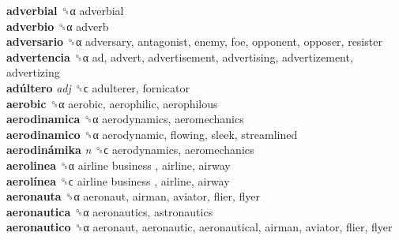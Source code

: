 \textbf{adverbial} ␝α  adverbial  \\
\textbf{adverbio} ␝α  adverb  \\
\textbf{adversario} ␝α  adversary, antagonist, enemy, foe, opponent, opposer, resister  \\
\textbf{advertencia} ␝α  ad, advert, advertisement, advertising, advertizement, advertizing  \\
\textbf{adúltero} \emph{adj}  ␝ϲ  adulterer, fornicator  \\
\textbf{aerobic} ␝α  aerobic, aerophilic, aerophilous  \\
\textbf{aerodinamica} ␝α  aerodynamics, aeromechanics  \\
\textbf{aerodinamico} ␝α  aerodynamic, flowing, sleek, streamlined  \\
\textbf{aerodinámika} \emph{n}  ␝ϲ  aerodynamics, aeromechanics  \\
\textbf{aerolinea} ␝α   airline business , airline, airway  \\
\textbf{aerolínea} ␝ϲ   airline business , airline, airway  \\
\textbf{aeronauta} ␝α  aeronaut, airman, aviator, flier, flyer  \\
\textbf{aeronautica} ␝α  aeronautics, astronautics  \\
\textbf{aeronautico} ␝α  aeronaut, aeronautic, aeronautical, airman, aviator, flier, flyer  \\
